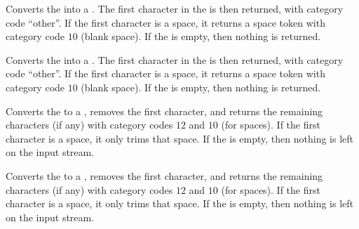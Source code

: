 \documentclass[oneside]{book}
\begin{document}
\begin{function}{\StrHead}
\begin{syntax}
 
\end{syntax}
Converts the  into a .
The first character in the  is then returned,
with category code \enquote{other}. If the first character is a space,
it returns a space token with category code $10$ (blank space).
If the  is empty, then nothing is returned.
\begin{demohigh}
\end{demohigh}
\end{function}

\begin{function}{\StrVarHead}
\begin{syntax}
 
\end{syntax}
Converts the  into a .
The first character in the  is then returned,
with category code \enquote{other}. If the first character is a space,
it returns a space token with category code $10$ (blank space).
If the  is empty, then nothing is returned.
\begin{demohigh}
\StrSet {}
\StrVarHead \lTmpaStr
\end{demohigh}
\end{function}

\begin{function}{\StrTail}
\begin{syntax}
 
\end{syntax}
Converts the  to a , removes the first
character, and returns the remaining characters (if any)
with category codes $12$ and $10$ (for spaces).
If the first character is a space, it only trims that space.
If the  is empty,
then nothing is left on the input stream.
\begin{demohigh}
\end{demohigh}
\end{function}

\begin{function}{\StrVarTail}
\begin{syntax}
 
\end{syntax}
Converts the  to a , removes the first
character, and returns the remaining characters (if any)
with category codes $12$ and $10$ (for spaces).
If the first character is a space, it only trims that space.
If the  is empty,
then nothing is left on the input stream.
\begin{demohigh}
\StrSet {}
\StrVarTail \lTmpaStr
\end{demohigh}
\end{function}
\end{document}
